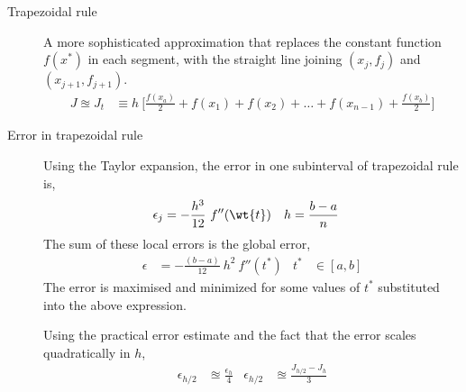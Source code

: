 \begin{description}
    \item[Trapezoidal rule] A more sophisticated approximation that replaces the
        constant function $ f(x^*) $ in each segment, with the straight line joining
        $ (x_j, f_j) $ and $ (x_{j+1}, f_{j+1}) $.
        \begin{align}
            J \approxeq J_t & \equiv h\ \Bigg[ \frac{f(x_a)}{2} + f(x_1) + f(x_2)
                + \dots + f(x_{n-1}) + \frac{f(x_b)}{2} \Bigg]
        \end{align}
        \begin{figure}[H]
            \centering
        \end{figure}

    \item[Error in trapezoidal rule] Using the Taylor expansion, the error in one
        subinterval of trapezoidal rule is,
        \begin{align}
            \epsilon_j & = -\frac{h^3}{12}\ f''(\wt{t}) & h & = \frac{b-a}{n}
        \end{align}
        The sum of these local errors is the global error,
        \begin{align}
            \epsilon & = -\frac{(b-a)}{12}\ h^2\ f''(t^*) &
            t^*      & \in [a,b]
        \end{align}
        The error is maximised and minimized for some values of $ t^* $ substituted into
        the above expression. \par
        Using the practical error estimate and the fact that the error scales
        quadratically in $ h $,
        \begin{align}
            \epsilon_{h/2} & \approxeq \frac{\epsilon_h}{4}    &
            \epsilon_{h/2} & \approxeq \frac{J_{h/2} - J_h}{3}
        \end{align}


\end{description}
